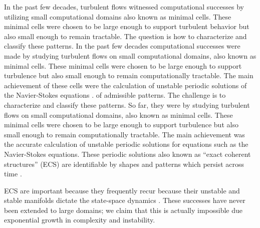 

In the past few decades, turbulent flows witnessed computational successes
by utilizing small computational domains also known as minimal cells.
These minimal cells were chosen to be large
enough to support turbulent behavior but also small enough to
remain tractable.
The question is how to characterize and classify these patterns.
In the past few decades computational successes were made
by studying turbulent flows on small computational domains, also known as minimal cells.
These minimal cells
were chosen to be large
enough to support turbulence but also small enough to
remain computationally tractable.
The main achievement of these cells
were the calculation of unstable periodic solutions of the
Navier-Stokes equations . %
of admissible patterns.
The challenge is to characterize and classify these patterns.
So far, they were
by studying turbulent flows on small computational domains, also known as minimal cells.
These minimal cells
were chosen to be large
enough to support turbulence but also small enough to
remain computationally tractable.
The main achievement
was the accurate calculation of unstable periodic solutions for
equations such as the Navier-Stokes equations. %
These periodic solutions also known as ``exact coherent structures'' (ECS) are
identifiable by shapes and patterns
which persist across time .

ECS are important because they frequently recur because their
unstable and stable manifolds dictate the state-space dynamics .
These successes have never been extended to large domains; we claim
that this is actually impossible due exponential growth in complexity and instability.

